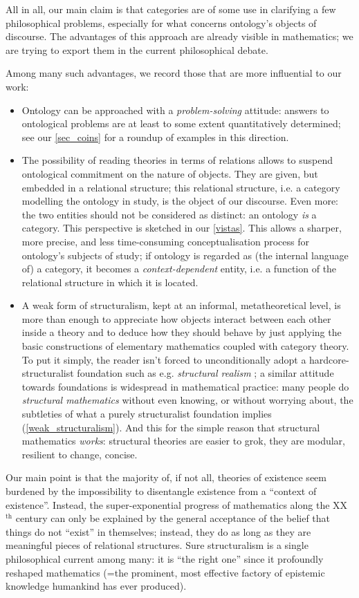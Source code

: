 All in all, our main claim is that categories are of some use in clarifying a few philosophical problems, especially for what concerns ontology's objects of discourse. The advantages of this approach are already visible in mathematics; we are trying to export them in the current philosophical debate.

Among many such advantages, we record those that are more influential to our work:
\begin{itemize}
    \item Ontology can be approached with a \emph{problem-solving} attitude: answers to ontological problems are at least to some extent quantitatively determined; see our \autoref{sec_coins} for a roundup of examples in this direction.
    \item The possibility of reading theories in terms of relations allows to suspend ontological commitment on the nature of objects. They are given, but embedded in a relational structure; this relational structure, i.e. a category modelling the ontology in study, is the object of our discourse. Even more: the two entities should not be considered as distinct: an ontology \emph{is} a category. This perspective is sketched in our \autoref{vistas}. This allows a sharper, more precise, and less time-consuming conceptualisation process for ontology's subjects of study; if ontology is regarded as (the internal language of) a category, it becomes a \emph{context-dependent} entity, i.e. a function of the relational structure in which it is located.
    \item A weak form of structuralism, kept at an informal, metatheoretical level, is more than enough to appreciate how objects interact between each other inside a theory and to deduce how they should behave by just applying the basic constructions of elementary mathematics coupled with category theory. To put it simply, the reader isn't forced to unconditionally adopt a hardcore-structuralist foundation such as e.g. \emph{structural realism} \cite{bain2013category,eva2016category}; a similar attitude towards foundations is widespread in mathematical practice: many people do \textit{structural mathematics} without even knowing, or without worrying about, the subtleties of what a purely structuralist foundation implies (\autoref{weak_structuralism}). And this for the simple reason that structural mathematics \emph{works}: structural theories are easier to grok, they are modular, resilient to change, concise.
\end{itemize}
Our main point is that the majority of, if not all, theories of existence seem burdened by the impossibility to disentangle existence from a ``context of existence''. Instead, the super-exponential progress of mathematics along the XX$^\text{th}$ century can only be explained by the general acceptance of the belief that things do not ``exist'' in themselves; instead, they do as long as they are meaningful pieces of relational structures. Sure structuralism is a single philosophical current among many: it is ``the right one'' since it profoundly reshaped mathematics (=the prominent, most effective factory of epistemic knowledge humankind has ever produced).


